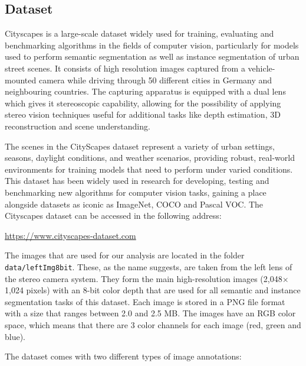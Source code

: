 \subsection{Dataset}

Cityscapes is a large-scale dataset widely used for training, evaluating and benchmarking algorithms in the fields of computer vision, particularly for models used to perform semantic segmentation as well as instance segmentation of urban street scenes. It consists of high resolution images captured from a vehicle-mounted camera while driving through 50 different cities in Germany and neighbouring countries. The capturing apparatus is equipped with a dual lens which gives it stereoscopic capability, allowing for the possibility of applying stereo vision techniques useful for additional tasks like depth estimation, 3D reconstruction and scene understanding. 

The scenes in the CityScapes dataset represent a variety of urban settings, seasons, daylight conditions, and weather scenarios, providing robust, real-world environments for training models that need to perform under varied conditions. This dataset has been widely used in research for developing, testing and benchmarking new algorithms for computer vision tasks, gaining a place alongside datasets as iconic as ImageNet, COCO and Pascal VOC. The Cityscapes dataset can be accessed in the following address:
\begin{center}
\url{https://www.cityscapes-dataset.com}
\end{center}

The images that are used for our analysis are located in the folder \small\texttt{data/leftImg8bit}. These, as the name suggests, are taken from the left lens of the stereo camera system. They form the main high-resolution images (2,048$\times$1,024 pixels) with an 8-bit color depth that are used for all semantic and instance segmentation tasks of this dataset. Each image is stored in a PNG file format with a size that ranges between 2.0 and 2.5 MB. The images have an RGB color space, which means that there are 3 color channels for each image (red, green and blue).

The dataset comes with two different types of image annotations:

